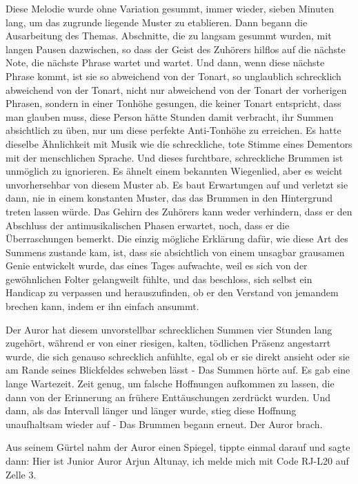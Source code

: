 Diese Melodie wurde ohne Variation gesummt, immer wieder, sieben Minuten lang,
um das zugrunde liegende Muster zu etablieren. Dann begann die Ausarbeitung des
Themas. Abschnitte, die zu langsam gesummt wurden, mit langen Pausen dazwischen,
so dass der Geist des Zuhörers hilflos auf die nächste Note, die nächste Phrase
wartet und wartet. Und dann, wenn diese nächste Phrase kommt, ist sie so
abweichend von der Tonart, so unglaublich schrecklich abweichend von der Tonart,
nicht nur abweichend von der Tonart der vorherigen Phrasen, sondern in einer
Tonhöhe gesungen, die keiner Tonart entspricht, dass man glauben muss, diese
Person hätte Stunden damit verbracht, ihr Summen absichtlich zu üben, nur um
diese perfekte Anti-Tonhöhe zu erreichen. Es hatte dieselbe Ähnlichkeit mit
Musik wie die schreckliche, tote Stimme eines Dementors mit der menschlichen
Sprache. Und dieses furchtbare, schreckliche Brummen ist unmöglich zu
ignorieren. Es ähnelt einem bekannten Wiegenlied, aber es weicht unvorhersehbar
von diesem Muster ab. Es baut Erwartungen auf und verletzt sie dann, nie in
einem konstanten Muster, das das Brummen in den Hintergrund treten lassen würde.
Das Gehirn des Zuhörers kann weder verhindern, dass er den Abschluss der
antimusikalischen Phasen erwartet, noch, dass er die Überraschungen bemerkt. Die
einzig mögliche Erklärung dafür, wie diese Art des Summens zustande kam, ist,
dass sie absichtlich von einem unsagbar grausamen Genie entwickelt wurde, das
eines Tages aufwachte, weil es sich von der gewöhnlichen Folter gelangweilt
fühlte, und das beschloss, sich selbst ein Handicap zu verpassen und
herauszufinden, ob er den Verstand von jemandem brechen kann, indem er ihn
einfach ansummt.

Der Auror hat diesem unvorstellbar schrecklichen Summen vier Stunden lang
zugehört, während er von einer riesigen, kalten, tödlichen Präsenz angestarrt
wurde, die sich genauso schrecklich anfühlte, egal ob er sie direkt ansieht oder
sie am Rande seines Blickfeldes schweben lässt - Das Summen hörte auf. Es gab
eine lange Wartezeit. Zeit genug, um falsche Hoffnungen aufkommen zu lassen, die
dann von der Erinnerung an frühere Enttäuschungen zerdrückt wurden. Und dann,
als das Intervall länger und länger wurde, stieg diese Hoffnung unaufhaltsam
wieder auf - Das Brummen begann erneut. Der Auror brach.

Aus seinem Gürtel nahm der Auror einen Spiegel, tippte einmal darauf und sagte
dann: \glqq{}Hier ist Junior Auror Arjun Altunay, ich melde mich mit Code RJ-L20
auf Zelle 3.\grqq{}

